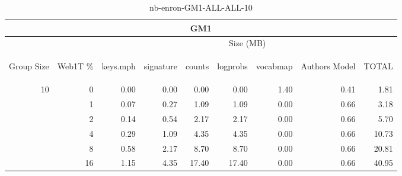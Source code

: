\begin{center}
\begin{table}[htbp] 
 \begin{center}
\begin{tabular}{ | r | r | r | r | r | r | r | r | r |}
\hline
\multicolumn{9}{|c|}{GM1}\\
\hline
 & & \multicolumn{7}{|c|}{Size (MB)}\\ \cline{3-9}
\begin{sideways}Group Size\end{sideways} & \begin{sideways}Web1T \% \end{sideways} & \begin{sideways}keys.mph\end{sideways} & \begin{sideways}signature\end{sideways} & \begin{sideways}counts\end{sideways} & \begin{sideways}logprobs\end{sideways} & \begin{sideways}vocabmap\end{sideways} & \begin{sideways}Authors Model \end{sideways} & \begin{sideways}TOTAL\end{sideways}\\
\hline
\multirow{5}{*}{10}
 & 0 & 0.00 & 0.00 & 0.00 & 0.00 & 1.40 & 0.41 & 1.81\\ \cline{2-9}
 & 1 & 0.07 & 0.27 & 1.09 & 1.09 & 0.00 & 0.66 & 3.18\\ \cline{2-9}
 & 2 & 0.14 & 0.54 & 2.17 & 2.17 & 0.00 & 0.66 & 5.70\\ \cline{2-9}
 & 4 & 0.29 & 1.09 & 4.35 & 4.35 & 0.00 & 0.66 & 10.73\\ \cline{2-9}
 & 8 & 0.58 & 2.17 & 8.70 & 8.70 & 0.00 & 0.66 & 20.81\\ \cline{2-9}
 & 16 & 1.15 & 4.35 & 17.40 & 17.40 & 0.00 & 0.66 & 40.95\\ \cline{2-9}
\hline
\end{tabular}
\caption{nb-enron-GM1-ALL-ALL-10}
\label{table:nb-enron-GM1-ALL-ALL-10}
\end{center}
 \end{table}
\end{center}

